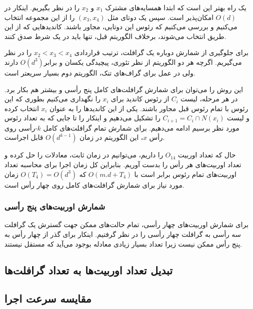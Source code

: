یک راه بهتر این است که ابتدا همسایه‌های مشترک $x_1$ و $x_2$ را در نظر بگیریم. اینکار در $O(d)$ امکان‌پذیر است. سپس یک دوتای مثل $(x_3,x_4)$ را از این مجموعه انتخاب می‌کنیم و بررسی می‌کنیم که رئوس این دوتایی، مجاور باشند. کاندید‌هایی که از این طریق انتخاب می‌شوند، برخلاف الگوریتم قبل، تنها باید در یک شرط صدق کنند.

برای جلوگیری از شمارش دوباره یک گرافلت، ترتیب قراردادی $x_2 < x_3 < x_4$ را در نظر می‌گیریم. اگرچه هر دو الگوریتم از نظر تئوری، پیچیدگی یکسان و برابر$O(d^3)$ دارند ولی در عمل برای گراف‌های تنک، الگوریتم دوم بسیار سریعتر است.

این روش را می‌توان برای شمارش گرافلت‌های کامل پنج رأسی و بیشتر هم بکار برد. در هر مرحله، لیست $C_i$ از رئوس کاندید برای $x_i$ را نگهداری می‌کنیم بطوری که این رئوس با تمام رئوس قبل مجاور باشند. یکی از این کاندیدها را به عنوان $x_i$ انتخاب کرده و لیست $C_{i+1} = C_i\cap N(x_i)$ را تشکیل می‌دهیم و اینکار را تا جایی که به تعداد رئوس مورد نظر برسیم ادامه می‌دهیم. برای شمارش تمام گرافلت‌های کامل $k$-رأسی روی رأس $x$، این الگوریتم در زمان $O(d^{k-1})$ قابل اجراست.

حال که تعداد اوربیت $O_{14}$ را داریم، می‌توانیم در زمان ثابت، معادلات را حل کرده و تعداد اوربیت‌های هر رأس را بدست آوریم. بنابراین کل زمان اجرا برای محاسبه تعداد اوربیت‌های تمام رئوس برابر است با $O(m.d+T_4)$ که $O(T_4) = O(d^3)$ زمان مورد نیاز برای شمارش گرافلت‌های کامل روی چهار رأس است.



\subsubsection{شمارش اوربیت‌های پنج رأسی}
برای شمارش اوربیت‌های چهار رأسی، تمام حالت‌های ممکن جهت گسترش یک گرافلت سه رأسی به گرافلت چهار رأسی را در نظر گرفتیم. اینکار برای گذر از چهار رأس به پنج رأس ممکن نیست زیرا تعداد بسیار زیادی معادله بوجود می‌آید که مستقل نیستند. 

\subsection{تبدیل تعداد اوربیت‌ها به تعداد گرافلت‌ها}

\subsection{مقایسه سرعت اجرا}

